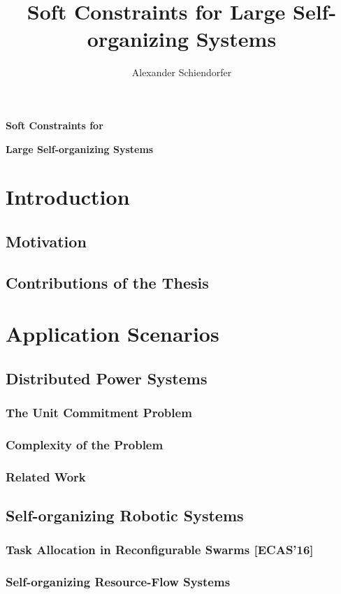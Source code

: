 \documentclass[10pt,a4paper]{book}
\author{Alexander Schiendorfer}
\title{Soft Constraints for Large Self-organizing Systems}
\begin{document}
\begingroup
\let\clearpage\relax
{\Huge \textbf{Soft Constraints for}}

\vspace*{2ex}

{\Huge   \textbf{Large Self-organizing Systems}}

\tableofcontents*
\endgroup
\newpage

\chapter{Introduction}
\section{Motivation}
\section{Contributions of the Thesis}

\chapter{Application Scenarios}
\section{Distributed Power Systems}
\subsection{The Unit Commitment Problem}
\subsection{Complexity of the Problem}
\subsection{Related Work}


\section{Self-organizing Robotic Systems}
\subsection{Task Allocation in Reconfigurable Swarms [ECAS'16]}
\subsection{Self-organizing Resource-Flow Systems}
\end{document}
